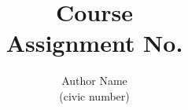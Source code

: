 \documentclass{article}
\begin{document}
\title {Course \\ Assignment No.}
\author{Author Name\\ \small (civic number)}

\maketitle
\end{document}
